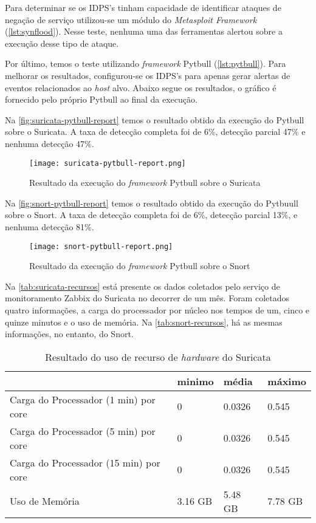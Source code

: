 Para determinar se os IDPS's tinham capacidade de identificar ataques de negação de serviço utilizou-se um módulo do \textit{Metasploit Framework} (\autoref{lst:synflood}). Nesse teste, nenhuma uma das ferramentas alertou sobre a execução desse tipo de ataque. 

Por último, temos o teste utilizando \textit{framework} Pytbull (\autoref{lst:pytbull}). Para melhorar os resultados, configurou-se os IDPS's para apenas gerar alertas de eventos relacionados ao \textit{host} alvo. Abaixo segue os resultados, o gráfico é fornecido pelo próprio Pytbull ao final da execução.

Na \autoref{fig:suricata-pytbull-report} temos o resultado obtido da execução do Pytbull sobre o Suricata. A taxa de detecção completa foi de 6\%, detecção parcial 47\% e nenhuma detecção 47\%.

\begin{figure}[!htb]
\centering
\caption{Resultado da execução do \textit{framework} Pytbull sobre o Suricata}
\texttt{[image: suricata-pytbull-report.png]}
\label{fig:suricata-pytbull-report}
\end{figure}

Na \autoref{fig:snort-pytbull-report} temos o resultado obtido da execução do Pytbuull sobre o Snort. A taxa de detecção completa foi de 6\%, detecção parcial 13\%, e nenhuma detecção 81\%.

\begin{figure}[!htb]
\centering
\caption{Resultado da execução do \textit{framework} Pytbull sobre o Snort}
\texttt{[image: snort-pytbull-report.png]}
\label{fig:snort-pytbull-report}
\end{figure}

Na \autoref{tab:suricata-recursos} está presente os dados coletados pelo serviço de monitoramento Zabbix do Suricata no decorrer de um mês. Foram coletados quatro informações, a carga do processador por núcleo nos tempos de um, cinco e quinze minutos e o uso de memória. Na \autoref{tab:snort-recursos}, há as mesmas informações, no entanto, do Snort.

\begin{table}[htb]
\ABNTEXfontereduzida
\centering
\caption{Resultado do uso de recurso de \textit{hardware} do Suricata}
\label{tab:suricata-recursos}
\begin{tabular}{|M{5cm}|M{2cm}|M{2cm}|M{2cm}|}
    \hline
     & \textbf{minimo} & \textbf{média} & \textbf{máximo} \\
    \hline
    Carga do Processador (1 min) por core & 0 & 0.0326 & 0.545 \\
    \hline
    Carga do Processador (5 min) por core & 0 & 0.0326 & 0.545 \\
    \hline
    Carga do Processador (15 min) por core & 0 & 0.0326 & 0.545 \\
    \hline
    Uso de Memória & 3.16 GB & 5.48 GB & 7.78 GB \\
    \hline
\end{tabular}
\end{table}

